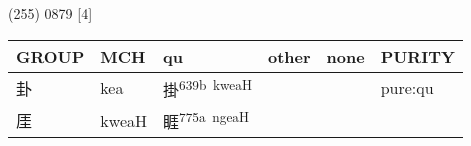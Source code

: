 \documentclass[14pt,a4paper]{scrartcl}
\begin{document}
(255) 0879 {[}4{]}

\begin{longtable}[c]{@{}llllll@{}}
\toprule
\begin{minipage}[b]{0.14\columnwidth}\raggedright\strut
GROUP
\strut\end{minipage} &
\begin{minipage}[b]{0.14\columnwidth}\raggedright\strut
MCH
\strut\end{minipage} &
\begin{minipage}[b]{0.14\columnwidth}\raggedright\strut
qu
\strut\end{minipage} &
\begin{minipage}[b]{0.14\columnwidth}\raggedright\strut
other
\strut\end{minipage} &
\begin{minipage}[b]{0.14\columnwidth}\raggedright\strut
none
\strut\end{minipage} &
\begin{minipage}[b]{0.14\columnwidth}\raggedright\strut
PURITY
\strut\end{minipage}\tabularnewline
\midrule
\endhead
\begin{minipage}[t]{0.14\columnwidth}\raggedright\strut
卦
\strut\end{minipage} &
\begin{minipage}[t]{0.14\columnwidth}\raggedright\strut
kea
\strut\end{minipage} &
\begin{minipage}[t]{0.14\columnwidth}\raggedright\strut
掛\textsuperscript{639b~kweaH}
\strut\end{minipage} &
\begin{minipage}[t]{0.14\columnwidth}\raggedright\strut
\strut\end{minipage} &
\begin{minipage}[t]{0.14\columnwidth}\raggedright\strut
\strut\end{minipage} &
\begin{minipage}[t]{0.14\columnwidth}\raggedright\strut
pure:qu
\strut\end{minipage}\tabularnewline
\begin{minipage}[t]{0.14\columnwidth}\raggedright\strut
厓
\strut\end{minipage} &
\begin{minipage}[t]{0.14\columnwidth}\raggedright\strut
kweaH
\strut\end{minipage} &
\begin{minipage}[t]{0.14\columnwidth}\raggedright\strut
睚\textsuperscript{775a~ngeaH}

\end{minipage}
\end{longtable}
\end{document}
